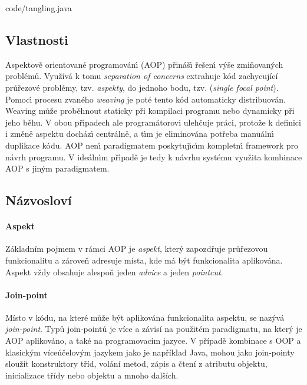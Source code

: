 
{code/tangling.java}

\subsection{Vlastnosti}
Aspektově orientované programován\'{\i} (\gls{AOP}) přináš\'{\i} řešen\'{\i}
v\'yše zmiňovaných problémů. Využívá k tomu \textit{separation of concerns} \textendash\xspace
extrahuje kód zachycující průřezové problémy, tzv. \textit{aspekty}, do jednoho bodu, tzv. (\textit{single focal point}).
Pomoc\'{\i} procesu zvaného \textit{weaving} je poté tento kód automaticky distribuován.
Weaving může proběhnout staticky při kompilaci programu nebo dynamicky
při jeho běhu. V obou př\'{\i}padech ale programátorovi ulehčuje práci,
protože k definici i změně aspektu docház\'{\i} centrálně, a t\'{\i}m je eliminována
potřeba manuáln\'{\i} duplikace kódu. \gls{AOP} nen\'{\i} paradigmatem poskytuj\'{\i}c\'{\i}m
kompletn\'{\i} framework pro návrh programu. V ideáln\'{\i}m př\'{\i}padě je tedy k návrhu
systému využita kombinace \gls{AOP} s jin\'ym paradigmatem.

\subsection{Názvosloví}

\paragraph{Aspekt}
Základním pojmem v rámci \gls{AOP} je \textit{aspekt},
který zapozdřuje průřezovou funkcionalitu a zároveň adresuje místa, kde má být
funkcionalita aplikována. Aspekt vždy obsahuje alespoň jeden \textit{advice}
a jeden \textit{pointcut}.

\paragraph{Join-point}
Místo v kódu, na které může být aplikována funkcionalita aspektu, se nazývá
\textit{join-point}. Typů join-pointů je více a závisí na použitém paradigmatu,
na který je \gls{AOP} aplikováno, a také na programovacím jazyce. V případě
kombinace s \gls{OOP} a klasickým víceúčelovým jazykem jako je například Java,
mohou jako join-pointy sloužit konstruktory tříd, volání metod, zápis a čtení
z atributu objektu, inicializace třídy nebo objektu a mnoho dalších.


